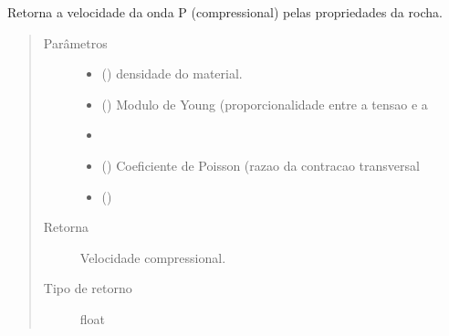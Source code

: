 \documentclass[letterpaper,10pt,brazil]{sphinxmanual}
\begin{document}
\begin{fulllineitems}
\label{\detokenize{source/base:base.velocity_p_by_young}}
Retorna a velocidade da onda P (compressional) pelas propriedades da
rocha.
\begin{quote}\begin{description}
\item[{Parâmetros}] \leavevmode\begin{itemize}
\item {} 
 () \textendash{} densidade do material.

\item {} 
 () \textendash{} Modulo de Young (proporcionalidade entre a tensao e a

\item {} 
\sphinxstyleliteralstrong{)}\sphinxstyleliteralstrong{} \textendash{} 

\item {} 
 () \textendash{} Coeficiente de Poisson (razao da contracao transversal

\item {} 
 () \textendash{} 

\end{itemize}

\item[{Retorna}] \leavevmode
Velocidade compressional.

\item[{Tipo de retorno}] \leavevmode
float

\end{description}\end{quote}

\end{fulllineitems}

\end{document}
